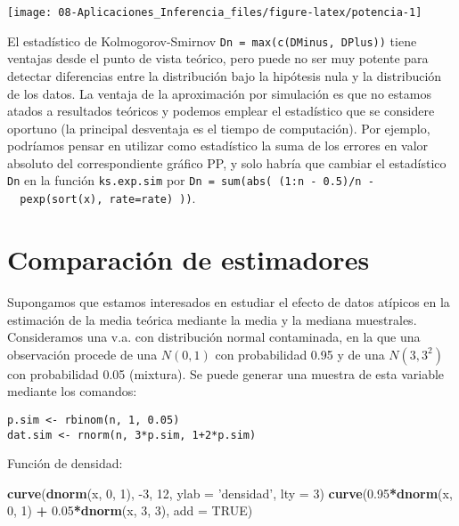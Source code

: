 \documentclass[
]{book}
\newenvironment{Shaded}{\begin{snugshade}}{\end{snugshade}}
\newcommand{\DataTypeTok}[1]{\textcolor[rgb]{0.13,0.29,0.53}{#1}}
\newcommand{\DecValTok}[1]{\textcolor[rgb]{0.00,0.00,0.81}{#1}}
\newcommand{\FloatTok}[1]{\textcolor[rgb]{0.00,0.00,0.81}{#1}}
\newcommand{\KeywordTok}[1]{\textcolor[rgb]{0.13,0.29,0.53}{\textbf{#1}}}
\newcommand{\NormalTok}[1]{#1}
\newcommand{\OperatorTok}[1]{\textcolor[rgb]{0.81,0.36,0.00}{\textbf{#1}}}
\newcommand{\OtherTok}[1]{\textcolor[rgb]{0.56,0.35,0.01}{#1}}
\newcommand{\StringTok}[1]{\textcolor[rgb]{0.31,0.60,0.02}{#1}}
\theoremstyle{break}
\theoremstyle{definition}
\theoremstyle{definition}
\theoremstyle{definition}
\theoremstyle{remark}
\let\BeginKnitrBlock\begin \let\EndKnitrBlock\end
\begin{document}
\begin{enumerate}
  \begin{center}\texttt{[image: 08-Aplicaciones\_Inferencia\_files/figure-latex/potencia-1]} \end{center}
\end{enumerate}

El estadístico de Kolmogorov-Smirnov \texttt{Dn\ =\ max(c(DMinus,\ DPlus))} tiene ventajas desde el
punto de vista teórico, pero puede no ser muy potente para detectar diferencias entre la
distribución bajo la hipótesis nula y la distribución de los datos.
La ventaja de la aproximación por simulación es que no estamos atados a resultados teóricos
y podemos emplear el estadístico que se considere oportuno
(la principal desventaja es el tiempo de computación).
Por ejemplo, podríamos pensar en utilizar como estadístico la suma de los errores en
valor absoluto del correspondiente gráfico PP, y solo habría que cambiar el estadístico
\texttt{Dn} en la función \texttt{ks.exp.sim} por \texttt{Dn\ =\ sum(abs(\ (1:n\ -\ 0.5)/n\ -\ \ pexp(sort(x),\ rate=rate)\ ))}.

\hypertarget{comparaciuxf3n-de-estimadores}{%
\section{Comparación de estimadores}\label{comparaciuxf3n-de-estimadores}}

\BeginKnitrBlock{exercise}
\protect\hypertarget{exr:unnamed-chunk-45}{}{\label{exr:unnamed-chunk-45} }
\EndKnitrBlock{exercise}

Supongamos que estamos interesados en estudiar el efecto de datos
atípicos en la estimación de la media teórica mediante la media y la mediana muestrales.
Consideramos una v.a. con distribución normal contaminada,
en la que una observación procede de una \(N(0,1)\) con probabilidad 0.95
y de una \(N(3,3^2)\) con probabilidad 0.05 (mixtura).
Se puede generar una muestra de esta
variable mediante los comandos:

\begin{verbatim}
p.sim <- rbinom(n, 1, 0.05)
dat.sim <- rnorm(n, 3*p.sim, 1+2*p.sim)
\end{verbatim}

Función de densidad:

\begin{Shaded}
\begin{Highlighting}[]
\KeywordTok{curve}\NormalTok{(}\KeywordTok{dnorm}\NormalTok{(x, }\DecValTok{0}\NormalTok{, }\DecValTok{1}\NormalTok{), }\DecValTok{-3}\NormalTok{, }\DecValTok{12}\NormalTok{, }\DataTypeTok{ylab =} \StringTok{'densidad'}\NormalTok{, }\DataTypeTok{lty =} \DecValTok{3}\NormalTok{)}
\KeywordTok{curve}\NormalTok{(}\FloatTok{0.95}\OperatorTok{*}\KeywordTok{dnorm}\NormalTok{(x, }\DecValTok{0}\NormalTok{, }\DecValTok{1}\NormalTok{) }\OperatorTok{+}\StringTok{ }\FloatTok{0.05}\OperatorTok{*}\KeywordTok{dnorm}\NormalTok{(x, }\DecValTok{3}\NormalTok{, }\DecValTok{3}\NormalTok{), }\DataTypeTok{add =} \OtherTok{TRUE}\NormalTok{)}
\end{Highlighting}
\end{Shaded}
\end{document}
